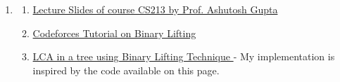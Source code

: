 \documentclass{report}
\begin{document}
\begin{titlepage}
\begin{enumerate}[label={\fontsize{14}{16}\selectfont \arabic*.}]
              \begin{enumerate}

                  \item The code can be simply compiled using g++ compiler:
                        \begin{verbatim}
                            g++ 23B0980.cpp -o exec
                        \end{verbatim}
                        and can be exectuted in the following way:
                        \begin{verbatim}
                            ./exec
                        \end{verbatim}
                  \item The executable asks for input from user and displays
                        the
                        result.

              \end{enumerate}

              \vspace{0.8em}

        \item {\fontsize{14}{16} \selectfont {}}

              \begin{enumerate}

                  \item

                        \href{https://www.cse.iitb.ac.in/~akg/courses/2024-ds/}{Lecture Slides of
                            course CS213 by Prof. Ashutosh Gupta}

                  \item

                        \href{https://codeforces.com/blog/entry/100826}{Codeforces Tutorial on
                            Binary Lifting}

                  \item

                        \href{https://www.geeksforgeeks.org/lca-in-a-tree-using-binary-lifting-technique/}{
                            LCA in a tree using Binary Lifting Technique
                        } -
                        {\fontsize{9}{15} \selectfont My implementation is
                        inspired by the code available on
                        this page.}

              \end{enumerate}

    \end{enumerate}

\end{titlepage}
\end{document}
